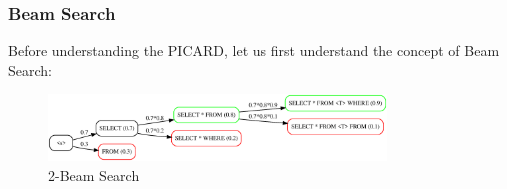 \subsubsection{Beam Search}
Before understanding the PICARD, let us first understand the concept of Beam Search:

\begin{figure}[H]
    \centering
    \includegraphics[width=0.8\textwidth]{pics/picard/beam/beam.eps}
    \caption{2-Beam Search}
    \label{fig:beam_search}
\end{figure}

